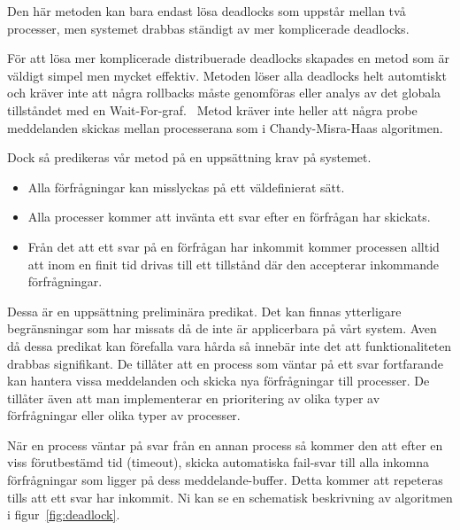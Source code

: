 \documentclass[12pt]{article}
\begin{document}
Den här metoden kan bara endast lösa deadlocks som uppstår mellan två processer,
men systemet drabbas ständigt av mer komplicerade deadlocks.

För att lösa mer komplicerade distribuerade deadlocks skapades en metod som är väldigt simpel men mycket effektiv.
Metoden löser alla deadlocks helt automtiskt och kräver inte att några rollbacks måste genomföras eller analys av det globala tillståndet med en Wait-For-graf.~\cite{krzyzanowski-ddeadlock}
Metod kräver inte heller att några probe meddelanden skickas mellan processerana som i Chandy-Misra-Haas algoritmen.~\cite{chandy1983distributed}

Dock så predikeras vår metod på en uppsättning krav på systemet.

\begin{itemize}
    \item Alla förfrågningar kan misslyckas på ett väldefinierat sätt.
    \item Alla processer kommer att invänta ett svar efter en förfrågan har skickats.
    \item Från det att ett svar på en förfrågan har inkommit kommer processen alltid att inom en finit tid drivas till ett tillstånd där den accepterar inkommande förfrågningar.
\end{itemize}

Dessa är en uppsättning preliminära predikat.
Det kan finnas ytterligare begränsningar som har missats då de inte är applicerbara på vårt system.
Aven då dessa predikat
kan förefalla vara hårda så innebär inte det att funktionaliteten drabbas signifikant.
De tillåter att en process som väntar på ett svar fortfarande kan hantera vissa meddelanden och skicka nya förfrågningar till processer.
De tillåter även att man implementerar en prioritering av olika typer av förfrågningar eller olika typer av processer.

När en process väntar på svar från en annan process så kommer den att efter en viss förutbestämd tid (timeout),
skicka automatiska fail-svar till alla inkomna förfrågningar som ligger på dess meddelande-buffer.
Detta kommer att repeteras tills att ett svar har inkommit.
Ni kan se en schematisk beskrivning av algoritmen i figur~\ref{fig:deadlock}.
\end{document}
